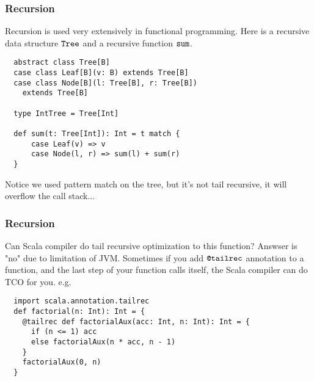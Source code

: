 \documentclass[handout]{beamer}
\begin{document}

\begin{frame}[fragile]
  \frametitle{Recursion}
  Recursion is used very extensively in functional programming. Here is a recursive data structure $\verb|Tree|$ and a recursive function $\verb|sum|$.
  \begin{verbatim}
  abstract class Tree[B]
  case class Leaf[B](v: B) extends Tree[B]
  case class Node[B](l: Tree[B], r: Tree[B])
    extends Tree[B]

  type IntTree = Tree[Int]
  
  def sum(t: Tree[Int]): Int = t match {
      case Leaf(v) => v
      case Node(l, r) => sum(l) + sum(r)
  }
  \end{verbatim}
  Notice we used pattern match on the tree, but it's not tail recursive, it will overflow the call stack...
\end{frame}

\begin{frame}[fragile]
  \frametitle{Recursion}
  Can Scala compiler do tail recursive optimization to this function? Answser is "no" due to limitation of JVM.
  Sometimes if you add $\verb|@tailrec|$ annotation to a function, and the last step of your function calls itself, the Scala compiler can do TCO for you. e.g.
  \begin{verbatim}
  import scala.annotation.tailrec
  def factorial(n: Int): Int = {
    @tailrec def factorialAux(acc: Int, n: Int): Int = {
      if (n <= 1) acc
      else factorialAux(n * acc, n - 1)
    }
    factorialAux(0, n)
  }
  \end{verbatim}
\end{frame}
\end{document}
